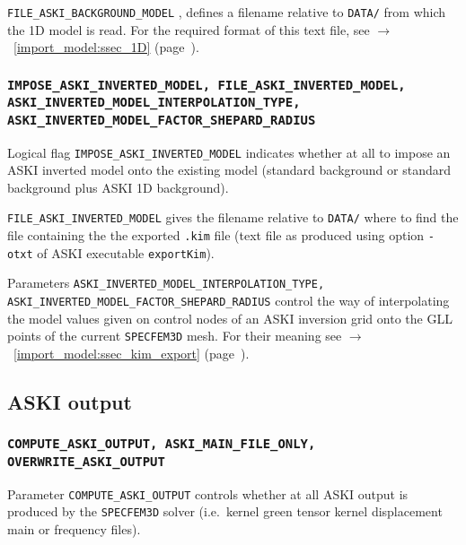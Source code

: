 \documentclass[12pt,a4paper]{article}
\newcommand{\lcode}[1]{\nolinkurl{#1}}
\newcommand{\lcodetitle}[1]{ {\ttfamily #1} }
\newcommand{\ASKI}{ {\ttfamily ASKI} }
\newcommand{\myaref}[1]{$\rightarrow$~\ref{#1} (page~\pageref{#1})}
\begin{document}
\lcode{FILE_ASKI_BACKGROUND_MODEL} , defines a filename relative to \lcode{DATA/} from which the 1D model
is read. For the required format of this text file, see \myaref{import_model:ssec_1D}.

\subsubsection*{\lcode{IMPOSE_ASKI_INVERTED_MODEL, FILE_ASKI_INVERTED_MODEL, ASKI_INVERTED_MODEL_INTERPOLATION_TYPE, 
ASKI_INVERTED_MODEL_FACTOR_SHEPARD_RADIUS}}
Logical flag \lcode{IMPOSE_ASKI_INVERTED_MODEL} indicates whether at all to impose an \ASKI inverted model
onto the existing model (standard background or standard background plus \ASKI 1D background).

\lcode{FILE_ASKI_INVERTED_MODEL} gives the filename relative to \lcode{DATA/} where to find the file containing
the the exported \lcode{.kim} file (text file as produced using option \lcode{-otxt} of \ASKI executable 
\lcode{exportKim}).

Parameters \lcode{ASKI_INVERTED_MODEL_INTERPOLATION_TYPE, ASKI_INVERTED_MODEL_FACTOR_SHEPARD_RADIUS} control the
way of interpolating the model values given on control nodes of an \ASKI inversion grid onto the GLL points of
the current \lcode{SPECFEM3D} mesh. For their meaning see \myaref{import_model:ssec_kim_export}.


\subsection{\lcodetitle{ASKI} output} \label{Par_file_ASKI,sub:output}
\subsubsection*{\lcode{COMPUTE_ASKI_OUTPUT, ASKI_MAIN_FILE_ONLY, OVERWRITE_ASKI_OUTPUT}}
Parameter \lcode{COMPUTE_ASKI_OUTPUT} controls whether at all \ASKI output is produced by the \lcode{SPECFEM3D} 
solver (i.e.\ kernel green tensor kernel displacement main or frequency files). 
\end{document}
